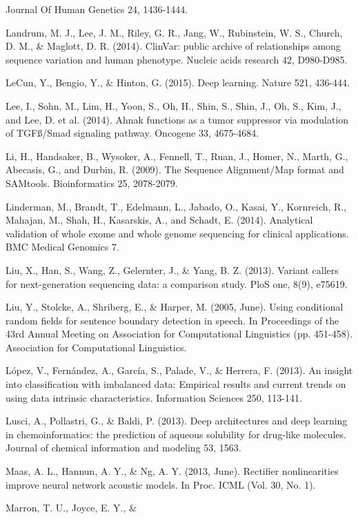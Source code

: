 \documentclass{article}
\begin{document}
\begin{list}{}{%
\setlength{\topsep}{0pt}%
\setlength{\leftmargin}{0.5in}%
\setlength{\listparindent}{-0.5in}%
\setlength{\itemindent}{-0.5in}%
\setlength{\parsep}{\parskip}%
}
Journal Of Human Genetics 24, 1436-1444.\\\item[] Landrum, M. J., Lee, J. M., Riley, G. R., Jang, W., Rubinstein, W. S., Church, D. M., \& Maglott, D. R. (2014). ClinVar: public archive of relationships among sequence variation and human phenotype. Nucleic acids research 42, D980-D985.\\\item[] LeCun, Y., Bengio, Y., \& Hinton, G. (2015). Deep learning. Nature 521, 436-444.\\\item[] Lee, I., Sohn, M., Lim, H., Yoon, S., Oh, H., Shin, S., Shin, J., Oh, S., Kim, J., and Lee, D. et al. (2014). Ahnak functions as a tumor suppressor via modulation of TGFß/Smad signaling pathway. Oncogene 33, 4675-4684.\\\item[] Li, H., Handsaker, B., Wysoker, A., Fennell, T., Ruan, J., Homer, N., Marth, G., Abecasis, G., and Durbin, R. (2009). The Sequence Alignment/Map format and SAMtools. Bioinformatics 25, 2078-2079.\\\item[] Linderman, M., Brandt, T., Edelmann, L., Jabado, O., Kasai, Y., Kornreich, R., Mahajan, M., Shah, H., Kasarskis, A., and Schadt, E. (2014). Analytical validation of whole exome and whole genome sequencing for clinical applications. BMC Medical Genomics 7.\\\item[] Liu, X., Han, S., Wang, Z., Gelernter, J., \& Yang, B. Z. (2013). Variant callers for next-generation sequencing data: a comparison study. PloS one, 8(9), e75619.\\\item[] Liu, Y., Stolcke, A., Shriberg, E., \& Harper, M. (2005, June). Using conditional random fields for sentence boundary detection in speech. In Proceedings of the 43rd Annual Meeting on Association for Computational Linguistics (pp. 451-458). Association for Computational Linguistics.\\\item[] López, V., Fernández, A., García, S., Palade, V., \& Herrera, F. (2013). An insight into classification with imbalanced data: Empirical results and current trends on using data intrinsic characteristics. Information Sciences 250, 113-141.\\\item[] Lusci, A., Pollastri, G., \& Baldi, P. (2013). Deep architectures and deep learning in chemoinformatics: the prediction of aqueous solubility for drug-like molecules. Journal of chemical information and modeling 53, 1563.\\\item[] Maas, A. L., Hannun, A. Y., \& Ng, A. Y. (2013, June). Rectifier nonlinearities improve neural network acoustic models. In Proc. ICML (Vol. 30, No. 1).\\\item[] Marron, T. U., Joyce, E. Y., \& 
\end{list}
\end{document}
